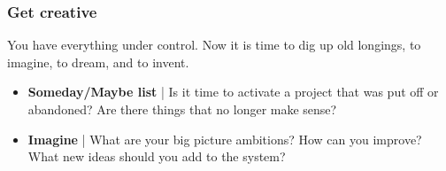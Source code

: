 \subsubsection*{Get creative}
You have everything under control. Now it is time to dig up old longings, to imagine, to dream, and to invent.
\begin{itemize}
\item \textbf{Someday/Maybe list} | Is it time to activate a project that was put off or abandoned? Are there things that no longer make sense?

\item \textbf{Imagine} | What are your big picture ambitions? How can you improve? What new ideas should you add to the system?

\end{itemize}